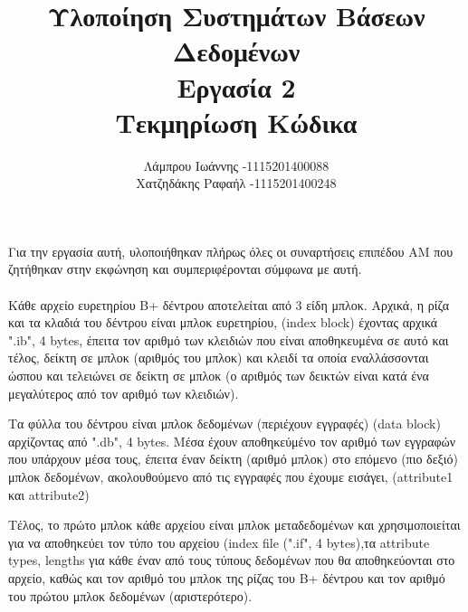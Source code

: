 \documentclass{article}
\begin{document}
\title{\vspace{-3.5cm}\textbf{Υλοποίηση Συστημάτων Βάσεων Δεδομένων}\\Εργασία 2\\ Τεκμηρίωση Κώδικα}
\author{Λάμπρου Ιωάννης -\textlatin{1115201400088}\\ Χατζηδάκης Ραφαήλ -\textlatin{1115201400248}}

\maketitle
\paragraph{}
Για την εργασία αυτή, υλοποιήθηκαν πλήρως όλες οι συναρτήσεις επιπέδου ΑΜ που ζητήθηκαν στην εκφώνηση και συμπεριφέρονται σύμφωνα με αυτή. \\ 
\paragraph{}
Κάθε αρχείο ευρετηρίου Β+ δέντρου αποτελείται από 3 είδη μπλοκ. Αρχικά, η ρίζα και τα κλαδιά του δέντρου είναι μπλοκ ευρετηρίου,
\textlatin{(index block)} έχοντας αρχικά \textlatin{".ib", 4 bytes}, έπειτα τον αριθμό των κλειδιών που είναι αποθηκευμένα σε αυτό και τέλος, δείκτη σε μπλοκ (αριθμός του μπλοκ) και κλειδί
τα οποία εναλλάσσονται ώσπου και τελειώνει σε δείκτη σε μπλοκ (ο αριθμός των δεικτών είναι κατά ένα μεγαλύτερος από τον αριθμό των κλειδιών).

Τα φύλλα του δέντρου είναι μπλοκ δεδομένων (περιέχουν εγγραφές) \textlatin{(data block)} αρχίζοντας από \textlatin{".db", 4 bytes}. Μέσα έχουν αποθηκεύμένο τον αριθμό των εγγραφών που υπάρχουν μέσα τους, έπειτα έναν δείκτη (αριθμό μπλοκ) στο επόμενο (πιο δεξιό) μπλοκ δεδομένων, ακολουθούμενο από τις εγγραφές που έχουμε εισάγει, 
(\textlatin{attribute1} και \textlatin{attribute2})

Τέλος, το πρώτο μπλοκ κάθε αρχείου είναι μπλοκ μεταδεδομένων και χρησιμοποιείται για να αποθηκεύει τον τύπο του αρχείου 
\textlatin{(index file (".if", 4 bytes)},τα \textlatin{attribute types, lengths} για κάθε έναν από τους τύπους δεδομένων που θα αποθηκεύονται στο αρχείο, καθώς και τον αριθμό του μπλοκ της ρίζας του Β+ δέντρου και τον αριθμό του πρώτου μπλοκ δεδομένων (αριστερότερο).
\end{document}
